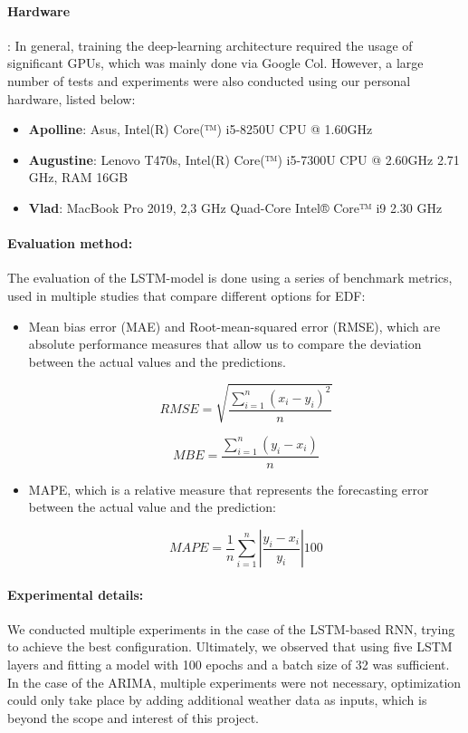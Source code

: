 \documentclass[10pt,twocolumn,letterpaper]{article}
\begin{document}
\paragraph{Hardware}: 
In general, training the deep-learning architecture required the usage of significant GPUs, which was mainly done via Google Col. However, a large number of tests and experiments were also conducted using our personal hardware, listed below:

\begin{itemize}
\item \textbf{Apolline}: Asus, Intel(R) Core(™) i5-8250U CPU @
1.60GHz
\item \textbf{Augustine}: Lenovo T470s, Intel(R) Core(™) i5-7300U
CPU @ 2.60GHz 2.71 GHz, RAM 16GB
\item \textbf{Vlad}: MacBook Pro 2019, 2,3 GHz Quad-Core Intel® Core™ i9 2.30 GHz
\end{itemize}
\paragraph{Evaluation method:} 

The evaluation of the LSTM-model is done using a series of benchmark metrics, used in multiple studies that compare different options for EDF:
\begin{itemize}

\item Mean bias error (MAE) and  Root-mean-squared
error (RMSE), which are absolute performance measures that allow us to compare the deviation between
the actual values and the predictions.

$$ RMSE = \sqrt{\frac{\sum_{i=1}^{n}(x_i-y_i)^2}{n}} $$

$$ MBE= \frac{\sum_{i=1}^{n}(y_i-x_i)}{n} $$

\item MAPE, which is a relative measure that represents the forecasting error between the actual value and the prediction:

$$MAPE=\frac{1}{n}\sum_{i=1}^{n}|\frac{y_i-x_i}{y_i}|100$$

\end{itemize}


\paragraph{Experimental details:} We conducted multiple experiments in the case of the LSTM-based RNN, trying to achieve the best configuration. Ultimately, we observed that using five LSTM layers and fitting a model with 100 epochs and a batch size of 32 was sufficient. In the case of the ARIMA, multiple experiments were not necessary, optimization could only take place by adding additional weather data as inputs, which is beyond the scope and interest of this project.
\end{document}
